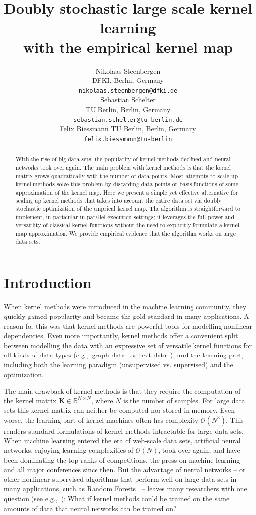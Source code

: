 \documentclass{article} %
\title{Doubly stochastic large scale kernel learning \\ with the empirical kernel map}
\author{
Nikolaas Steenbergen\\
DFKI, Berlin, Germany\\
\texttt{nikolaas.steenbergen@dfki.de}\\
\And
Sebastian Schelter\\
TU Berlin, Berlin, Germany\\
\texttt{sebastian.schelter@tu-berlin.de}\\
\And
Felix Biessmann
TU Berlin, Berlin, Germany\\
\texttt{felix.biessmann@tu-berlin}\\
}
\newcommand{\R}{\ensuremath{\mathds{R}}}
\renewcommand{\vec}[1]{\mathbf{#1}}
\begin{document}
\maketitle

\begin{abstract} 
With the rise of big data sets, the popularity of kernel methods declined and neural networks took over again. The main problem with kernel methods is that the kernel matrix grows quadratically with the number of data points. Most attempts to scale up kernel methods solve this problem by discarding data points or basis functions of some approximation of the kernel map. Here we present a simple yet effective alternative for scaling up kernel methods that takes into account the entire data set via doubly stochastic optimization of the emprical kernel map. The algorithm is straightforward to implement, in particular in parallel execution settings; it leverages the full power and versatility of classical kernel functions without the need to explicitly formulate a kernel map approximation. We provide empirical evidence that the algorithm works on large data sets. 
\end{abstract} 


\section{Introduction\vspace{-0.1in}}
\indent When kernel methods \cite{Muller:2001p2592,shawe2004kernel} were introduced in the machine learning community, they quickly gained popularity and became the gold standard in many applications. A reason for this was that kernel methods are powerful tools for modelling nonlinear dependencies. Even more importantly, kernel methods offer a convenient split between modelling the data with an expressive set of versatile kernel functions for all kinds of data types (e.g.,~graph data~\cite{shawe2004kernel} or text data~\cite{John2000}), and the learning part, including both the learning paradigm (unsupervised vs. supervised) and the optimization. 

The main drawback of kernel methods is that they require the computation of the kernel matrix $\vec{K}\in\R^{N\times N}$, where $N$ is the number of samples. For large data sets this kernel matrix can neither be computed nor stored in memory. Even worse, the learning part of kernel machines often has complexity $\mathcal{O}(N^3)$. This renders standard formulations of kernel methods intractable for large data sets. When machine learning entered the era of web-scale data sets, artificial neural networks, enjoying learning complexities of $\mathcal{O}(N)$, took over again, and have been dominating the top ranks of competitions, the press on machine learning and all major conferences since then. But the advantage of neural networks -- or other nonlinear supervised algorithms that perform well on large data sets in many applications, such as Random Forests~\cite{Breiman2001} -- leaves many researchers with one question (see e.g.,~\cite{Lu2014}): What if kernel methods could be trained on the same amounts of data that neural networks can be trained on? 
\end{document}
